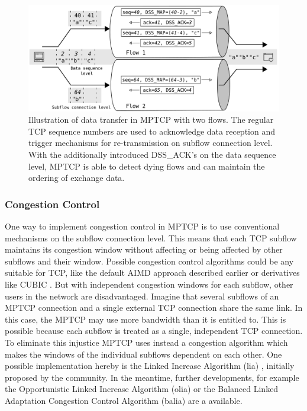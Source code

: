 \begin{figure}
	\begin{center}
		\def\svgwidth{1\textwidth}
		\includegraphics[scale=0.2]{../illustrations/importantConcepts/MPTCPDataTransfer.pdf}  
		\caption[Caption for the list of figures.]{Illustration of data transfer in MPTCP with two flows. The regular TCP sequence numbers are used to acknowledge data reception and trigger mechanisms for re-transmission on subflow connection level. With the additionally introduced DSS\_ACK's on the data sequence level, MPTCP is able to detect dying flows and can maintain the ordering of exchange data.}
		\label{fig:MPTCPDataTransfer}
	\end{center}
\end{figure}

\subsubsection{Congestion Control}

One way to implement congestion control in MPTCP is to use conventional mechanisms on the subflow connection level. This means that each TCP subflow maintains its congestion window without affecting or being affected by other subflows and their window. Possible congestion control algorithms could be any suitable for TCP, like the default AIMD approach \cite{rfc5681} described earlier or derivatives like CUBIC \cite{rfc8312}. But with independent congestion windows for each subflow, other users in the network are disadvantaged. Imagine that several subflows of an MPTCP connection and a single external TCP connection share the same link. In this case, the MPTCP may use more bandwidth than it is entitled to.  This is possible because each subflow is treated as a single, independent TCP connection. To eliminate this injustice MPTCP uses instead a congestion algorithm which makes the windows of the individual subflows dependent on each other. One possible implementation hereby is the Linked Increase Algorithm (lia) \cite{rfc6356}, initially proposed by the community.  In the meantime, further developments, for example the  Opportunistic Linked Increase Algorithm (olia) \cite{khalili-mptcp-congestion-control-05}  or the Balanced Linked Adaptation Congestion Control Algorithm (balia) \cite{walid-mptcp-congestion-control-04} are a available.

